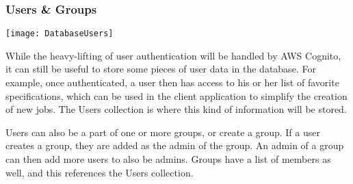 \subsubsection{Users \& Groups}
\begin{center}
  \texttt{[image: DatabaseUsers]} \\[12pt]
\end{center}
While the heavy-lifting of user authentication will be handled by AWS Cognito, it can still be useful to store some pieces of user data in the database. For example, once authenticated, a user then has access to his or her list of favorite specifications, which can be used in the client application to simplify the creation of new jobs. The Users collection is where this kind of information will be stored.\par
Users can also be a part of one or more groups, or create a group. If a user creates a group, they are added as the admin of the group. An admin of a group can then add more users to also be admins. Groups have a list of members as well, and this references the Users collection.\par

